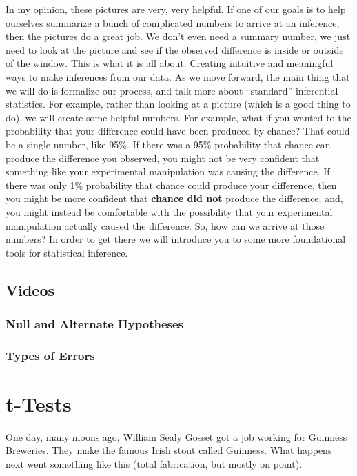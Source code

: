 \documentclass[
]{book}
\begin{document}
In my opinion, these pictures are very, very helpful. If one of our goals is to help ourselves summarize a bunch of complicated numbers to arrive at an inference, then the pictures do a great job. We don't even need a summary number, we just need to look at the picture and see if the observed difference is inside or outside of the window. This is what it is all about. Creating intuitive and meaningful ways to make inferences from our data. As we move forward, the main thing that we will do is formalize our process, and talk more about ``standard'' inferential statistics. For example, rather than looking at a picture (which is a good thing to do), we will create some helpful numbers. For example, what if you wanted to the probability that your difference could have been produced by chance? That could be a single number, like 95\%. If there was a 95\% probability that chance can produce the difference you observed, you might not be very confident that something like your experimental manipulation was causing the difference. If there was only 1\% probability that chance could produce your difference, then you might be more confident that \textbf{chance did not} produce the difference; and, you might instead be comfortable with the possibility that your experimental manipulation actually caused the difference. So, how can we arrive at those numbers? In order to get there we will introduce you to some more foundational tools for statistical inference.

\section{Videos}\label{videos-3}

\subsection{Null and Alternate Hypotheses}\label{null-and-alternate-hypotheses}

\subsection{Types of Errors}\label{types-of-errors}

\chapter{t-Tests}\label{t-tests}

One day, many moons ago, William Sealy Gosset got a job working for Guinness Breweries. They make the famous Irish stout called Guinness. What happens next went something like this (total fabrication, but mostly on point).
\end{document}

